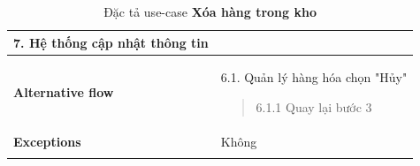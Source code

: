 \begin{longtable}{| p{} | p{} |}
                    7. Hệ thống cập nhật thông tin
                \\
                \hline
                \begin{flushleft}
                    \textbf{Alternative flow}
                \end{flushleft}
                &
                6.1. Quản lý hàng hóa chọn "Hủy"
                    \begin{quote} 
                    
                    6.1.1 Quay lại bước 3
                    \end{quote}
                \\
                \hline
                    \textbf{Exceptions} 
                &
                    Không
                \\
                \hline
                \caption{Đặc tả use-case \textbf{Xóa hàng trong kho}}
            \end{longtable}

